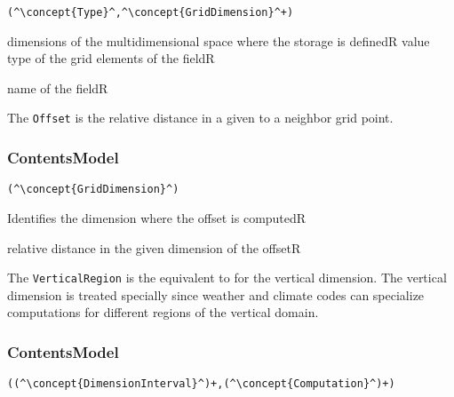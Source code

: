 \begin{lstlisting}[style=default,frame=none]
(^\concept{Type}^,^\concept{GridDimension}^+)
\end{lstlisting}

\begin{HIRChildElements}
	{dimensions of the multidimensional space where the storage is defined}{R}
	{value type of the grid elements of the field}{R}
\end{HIRChildElements}

\begin{HIRAttributes}
	{name of the field}{R}
\end{HIRAttributes}


The {\tt Offset} is the relative distance in a given  to a neighbor grid point.

\subsubsection*{ContentsModel}{}

\begin{lstlisting}[style=default,frame=none]
(^\concept{GridDimension}^)
\end{lstlisting}

\begin{HIRChildElements}
	{Identifies the dimension where the offset is computed}{R}
\end{HIRChildElements}

\begin{HIRAttributes}
	{relative distance in the given dimension of the offset}{R}
\end{HIRAttributes}

The {\tt VerticalRegion} is the equivalent to 
for the vertical dimension.
The vertical dimension is treated specially since weather and 
climate codes can specialize computations for different regions
of the vertical domain.

\subsubsection*{ContentsModel}{}

\begin{lstlisting}[style=default,frame=none]
((^\concept{DimensionInterval}^)+,(^\concept{Computation}^)+)
\end{lstlisting}

